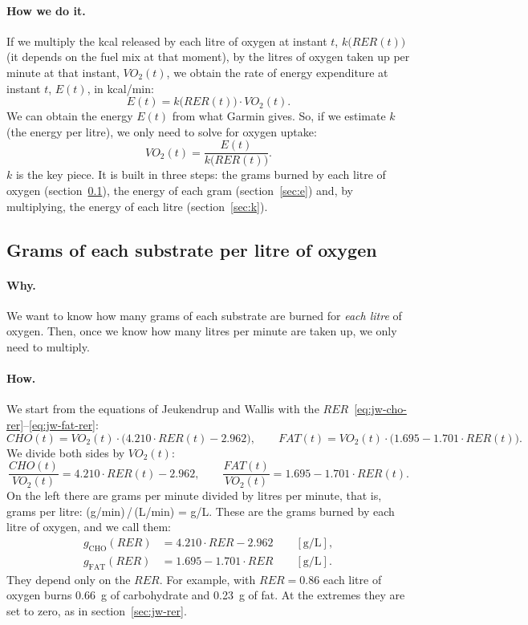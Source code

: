 \documentclass[10pt,a4paper]{article}
\newcommand{\sub}[1]{{\scriptscriptstyle\mathrm{#1}}}   %
\newcommand{\CHO}{\sub{CHO}}
\newcommand{\FAT}{\sub{FAT}}
\newcommand{\cho}{\ensuremath{\mathit{CHO}}}               %
\newcommand{\fat}{\ensuremath{\mathit{FAT}}}
\newcommand{\VO}{\ensuremath{\mathit{VO}_2}}               %
\newcommand{\RER}{\ensuremath{\mathit{RER}}}
\begin{document}
\paragraph{How we do it.} If we multiply the kcal released by each litre of oxygen at
instant $t$, $k\bigl(\RER(t)\bigr)$ (it depends on the fuel mix at that moment), by the
litres of oxygen taken up per minute at that instant, $\VO(t)$, we obtain the rate of
energy expenditure at instant $t$, $E(t)$, in kcal/min:
\begin{equation}
  E(t)=k\bigl(\RER(t)\bigr)\cdot\VO(t) .
  \label{eq:energia-k}
\end{equation}
We can obtain the energy $E(t)$ from what Garmin gives. So, if we estimate $k$ (the energy
per litre), we only need to solve for oxygen uptake:
\begin{equation}
  \VO(t)=\frac{E(t)}{k\bigl(\RER(t)\bigr)} .
  \label{eq:vo2}
\end{equation}
$k$ is the key piece. It is built in three steps: the grams burned by each litre of oxygen
(section~\ref{sec:g}), the energy of each gram (section~\ref{sec:e}) and, by multiplying,
the energy of each litre (section~\ref{sec:k}).

\subsection{Grams of each substrate per litre of oxygen}\label{sec:g}
\paragraph{Why.} We want to know how many grams of each substrate are burned for
\emph{each litre} of oxygen. Then, once we know how many litres per minute are taken up, we
only need to multiply.

\paragraph{How.} We start from the equations of Jeukendrup and Wallis with the
\RER~\eqref{eq:jw-cho-rer}--\eqref{eq:jw-fat-rer}:
\[
  \cho(t)=\VO(t)\cdot\bigl(4.210\cdot\RER(t)-2.962\bigr),\qquad
  \fat(t)=\VO(t)\cdot\bigl(1.695-1.701\cdot\RER(t)\bigr).
\]
We divide both sides by $\VO(t)$:
\[
  \frac{\cho(t)}{\VO(t)}=4.210\cdot\RER(t)-2.962,\qquad
  \frac{\fat(t)}{\VO(t)}=1.695-1.701\cdot\RER(t) .
\]
On the left there are grams per minute divided by litres per minute, that is, grams per
litre: (g/min)\,/\,(L/min) = g/L. These are the grams burned by each litre of oxygen, and
we call them:
\begin{align}
  g_{\CHO}(\RER) &= 4.210\cdot\RER-2.962 \qquad[\mathrm{g/L}], \label{eq:gc}\\
  g_{\FAT}(\RER) &= 1.695-1.701\cdot\RER \qquad[\mathrm{g/L}]. \label{eq:gf}
\end{align}
They depend only on the \RER. For example, with $\RER=0.86$ each litre of oxygen burns
0.66~g of carbohydrate and 0.23~g of fat. At the extremes they are set to zero, as in
section~\ref{sec:jw-rer}.
\end{document}
